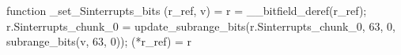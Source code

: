 function _set_Sinterrupts_bits (r_ref, v) = {
    r = __bitfield_deref(r_ref);
    r.Sinterrupts_chunk_0 = update_subrange_bits(r.Sinterrupts_chunk_0, 63, 0, subrange_bits(v, 63, 0));
    (*r_ref) = r
}
